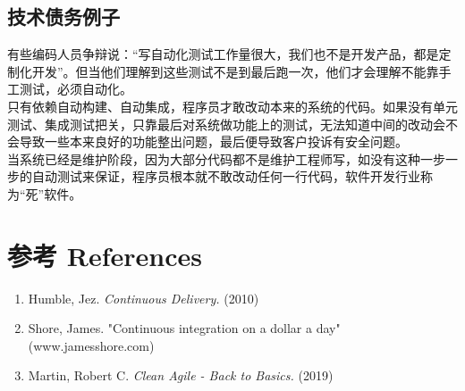 \begin{description}
\item[]
\end{description}

\hypertarget{ux6280ux672fux503aux52a1ux4f8bux5b50}{%
\subsection{技术债务例子}\label{ux6280ux672fux503aux52a1ux4f8bux5b50}}


有些编码人员争辩说：``写自动化测试工作量很大，我们也不是开发产品，都是定制化开发''。但当他们理解到这些测试不是到最后跑一次，他们才会理解不能靠手工测试，必须自动化。\\
只有依赖自动构建、自动集成，程序员才敢改动本来的系统的代码。如果没有单元测试、集成测试把关，只靠最后对系统做功能上的测试，无法知道中间的改动会不会导致一些本来良好的功能整出问题，最后便导致客户投诉有安全问题。\\
当系统已经是维护阶段，因为大部分代码都不是维护工程师写，如没有这种一步一步的自动测试来保证，程序员根本就不敢改动任何一行代码，软件开发行业称为``死''软件。\\

\hypertarget{ux53c2ux8003-references}{%
\section{参考 References}\label{ux53c2ux8003-references}}

\begin{enumerate}
\tightlist
\item
  Humble, Jez. \emph{Continuous Delivery.} (2010)\\
\item
  Shore, James. "Continuous integration on a dollar a day"
  (www.jamesshore.com)\\
\item
  Martin, Robert C. \emph{Clean Agile - Back to Basics.} (2019)\\
\end{enumerate}




